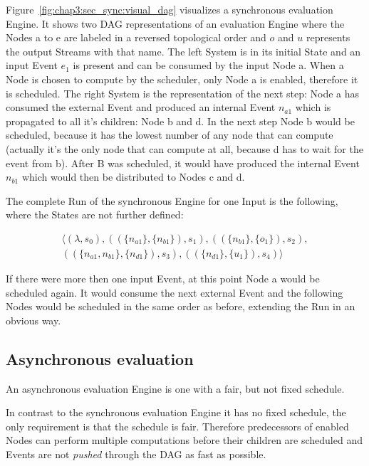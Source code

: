 Figure~\ref{fig:chap3:sec_sync:visual_dag} visualizes a synchronous evaluation Engine.
It shows two DAG representations of an evaluation Engine  where the Nodes a to e are labeled in a reversed topological order and \(o\) and \(u\) represents the output Streams with that name.
The left System is in its initial State and an input Event \(e_1\) is present and can be consumed by the input Node a.
When a Node is chosen to compute by the scheduler, only Node a is enabled, therefore it is scheduled.
The right System is the representation of the next step: Node a has consumed the external Event and produced an internal Event \(n_{a1}\) which is propagated to all it's children: Node b and d.
In the next step Node b would be scheduled, because it has the lowest number of any node that can compute (actually it's the only node that can compute at all, because d has to wait for the event from b).
After B was scheduled, it would have produced the internal Event \(n_{b1}\) which would then be distributed to Nodes c and d.

The complete Run of the synchronous Engine for one Input is the following, where the States are not further defined:

\begin{align*}
  \langle
    (\lambda,                             s_0),
    ((\{ n_{a1}         \}, \{n_{b1}\}),  s_1),
    ((\{ n_{b1}         \}, \{o_1\}),     s_2),\\
    ((\{ n_{a1}, n_{b1} \}, \{n_{d1}\}),  s_3),
    ((\{ n_{d1}         \}, \{u_1\}),     s_4)
  \rangle
\end{align*}

If there were more then one input Event, at this point Node a would be scheduled again.
It would consume the next external Event and the following Nodes would be scheduled in the same order as before, extending the Run in an obvious way.

\subsection{Asynchronous evaluation}
\label{sec:concepts:behaviour_without_timing:async}

An asynchronous evaluation Engine is one with a fair, but not fixed schedule.

In contrast to the synchronous evaluation Engine it has no fixed schedule, the only requirement is that the schedule is fair.
Therefore predecessors of enabled Nodes can perform multiple computations before their children are scheduled and Events are not \emph{pushed} through the DAG as fast as possible.

